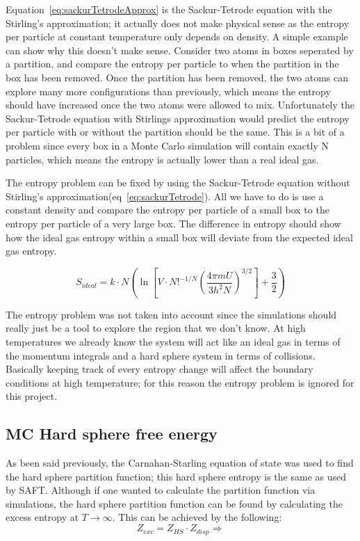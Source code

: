 Equation~\ref{eq:sackurTetrodeApprox} is the Sackur-Tetrode\cite{sackurTetrode} equation with the Stirling's approximation; it actually does not make physical sense as the entropy per particle at constant temperature only depends on density. A simple example can show why this doesn't make sense. Consider two atoms in boxes seperated by a partition, and compare the entropy per particle to when the partition in the box has been removed. Once the partition has been removed, the two atoms can explore many more configurations than previously, which means the entropy should have increased once the two atoms were allowed to mix. Unfortunately the Sackur-Tetrode equation with Stirlings approximation would predict the entropy per particle with or without the partition should be the same. This is a bit of a problem since every box in a Monte Carlo simulation will contain exactly N particles, which means the entropy is actually lower than a real ideal gas.

The entropy problem can be fixed by using the Sackur-Tetrode\cite{sackurTetrode} equation without Stirling's approximation(eq~\ref{eq:sackurTetrode}). All we have to do is use a constant density and compare the entropy per particle of a small box to the entropy per particle of a very large box. The difference in entropy should show how the ideal gas entropy within a small box will deviate from the expected ideal gas entropy.

\begin{equation}\label{eq:sackurTetrode}
S_{ideal}=k\cdot N \left ( \ln\left [ V\cdot N!^{-1/N}\left ( \frac{4 \pi mU}{3 h^2N}\right)^{3/2}  \right]+\frac{3}{2}\right )
\end{equation}

The entropy problem was not taken into account since the simulations should really just be a tool to explore the region that we don't know. At high temperatures we already know the system will act like an ideal gas in terms of the momentum integrals and a hard sphere system in terms of collisions. Basically keeping track of every entropy change will affect the boundary conditions at high temperature; for this reason the entropy problem is ignored for this project.


\subsection{MC Hard sphere free energy}
As been said previously, the Carnahan-Starling equation of state was used to find the hard sphere partition function; this hard sphere entropy is the same as used by SAFT. Although if one wanted to calculate the partition function via simulations, the hard sphere partition function can be found by calculating the excess entropy at $T\to\infty$. This can be achieved by the following:
\begin{equation}\label{eq:MCHS1}
Z_{exc}=Z_{HS}\cdot Z_{disp}\Rightarrow
\end{equation}

